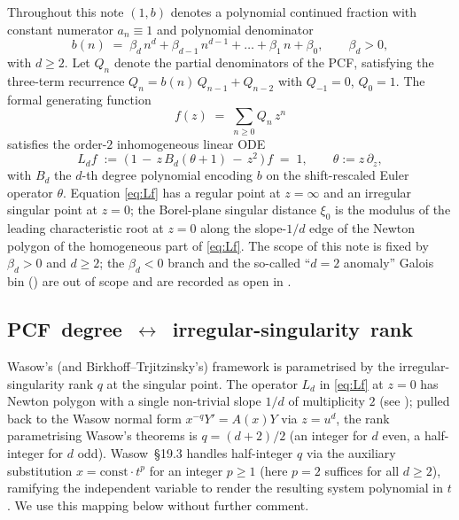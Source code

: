 \documentclass[11pt,reqno]{amsart}
\theoremstyle{plain}
\theoremstyle{definition}
\theoremstyle{remark}
\begin{document}
Throughout this note $(1, b)$ denotes a polynomial continued
fraction with constant numerator $a_n \equiv 1$ and
polynomial denominator
\[
  b(n) \;=\; \beta_d\,n^d + \beta_{d-1}\,n^{d-1} + \dots
              + \beta_1\,n + \beta_0,
  \qquad \beta_d > 0,
\]
with $d \ge 2$. Let $Q_n$ denote the partial denominators
of the PCF, satisfying the three-term recurrence
$Q_n = b(n)\,Q_{n-1} + Q_{n-2}$ with $Q_{-1} = 0$,
$Q_0 = 1$. The formal generating function
\[
  f(z) \;=\; \sum_{n\ge 0} Q_n\,z^n
\]
satisfies the order-$2$ inhomogeneous linear ODE
\begin{equation}
\label{eq:Lf}
  L_d f \;:=\;
   \bigl(\,1 \,-\, z\,B_d(\theta + 1)
            \,-\, z^2\,\bigr)\,f \;=\; 1,
  \qquad \theta := z\,\partial_z,
\end{equation}
with $B_d$ the $d$-th degree polynomial encoding $b$ on the
shift-rescaled Euler operator $\theta$. Equation
\eqref{eq:Lf} has a regular point at $z = \infty$ and an
irregular singular point at $z = 0$; the Borel-plane
singular distance $\xi_0$ is the modulus of the leading
characteristic root at $z = 0$ along the slope-$1/d$ edge
of the Newton polygon of the homogeneous part of
\eqref{eq:Lf}. The scope of this note is fixed by
$\beta_d > 0$ and $d \ge 2$; the $\beta_d < 0$ branch and
the so-called ``$d = 2$ anomaly'' Galois bin
(\cite[Remark~5.E]{siarc_pcf1_v13}) are out of scope and
are recorded as open in .

\subsection*{PCF~degree~$\leftrightarrow$~irregular-singularity~rank}
\label{ssec:dq-mapping}

Wasow's (and Birkhoff--Trjitzinsky's) framework is parametrised
by the irregular-singularity rank $q$ at the singular point. The
operator $L_d$ in \eqref{eq:Lf} at $z = 0$ has Newton polygon
with a single non-trivial slope $1/d$ of multiplicity $2$
(see \cite[Prop.~3.3.A]{siarc_channel_theory_v13}); pulled back
to the Wasow normal form $x^{-q} Y' = A(x) Y$ via
$z = u^d$, the rank parametrising Wasow's theorems is
$q = (d+2)/2$ (an integer for $d$ even, a half-integer for
$d$ odd). Wasow~\S19.3 handles half-integer $q$ via the
auxiliary substitution $x = \mathrm{const}\cdot t^p$ for an
integer $p \ge 1$ (here $p = 2$ suffices for all $d \ge 2$),
ramifying the independent variable to render the resulting
system polynomial in $t$. We use this mapping below without
further comment.
\end{document}
